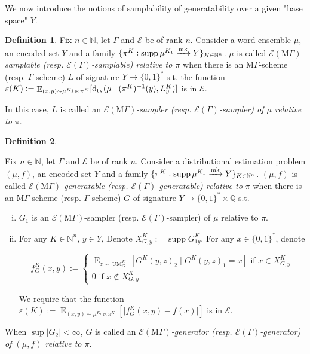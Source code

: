 \documentclass{article}
\numberwithin{equation}{section}
\theoremstyle{definition}
\newtheorem{definition}{Definition}[section]
\theoremstyle{plain}
\newcommand{\Bool}{\{0,1\}}
\newcommand{\Words}{{\Bool^*}}
\DeclareMathOperator{\Supp}{supp}
\DeclareMathOperator{\E}{E}
\DeclareMathOperator{\UM}{UM}
\newcommand{\Dtv}{\operatorname{d}_{\textnormal{tv}}}
\newcommand{\Nats}{\mathbb{N}}
\newcommand{\Rats}{\mathbb{Q}}
\newcommand{\Abs}[1]{\lvert #1 \rvert}
\newcommand{\MGrow}{\mathrm{M}\Gamma}
\newcommand{\Fall}{\mathcal{E}}
\newcommand{\Markov}{\xrightarrow{\textnormal{mk}}}
\begin{document}
We now introduce the notions of samplability of generatability over a given "base space" $Y$.

\begin{definition}

Fix $n \in \Nats$, let $\Gamma$ and $\Fall$ be of rank $n$. Consider a word ensemble $\mu$, an encoded set $Y$ and a family ${\{\pi^K: \Supp \mu^{K_1} \Markov Y\}_{K \in \Nats^n}}$. $\mu$ is called \emph{$\Fall(\MGrow)$-samplable (resp. $\Fall(\Gamma)$-samplable) relative to $\pi$} when there is an $\MGrow$-scheme (resp. $\Gamma$-scheme) $L$ of signature $Y \rightarrow \Words$ s.t. the function ${\varepsilon(K):=\E_{(x,y) \sim \mu^{K_1} \ltimes \pi^K}[\Dtv(\mu \mid (\pi^K)^{-1}(y),L_y^K)]}$ is in $\Fall$.

In this case, $L$ is called an \emph{$\Fall(\MGrow)$-sampler (resp. $\Fall(\Gamma)$-sampler) of $\mu$ relative to $\pi$}.

\end{definition}

\begin{samepage}
\begin{definition}
\label{def:gen_rel}

Fix $n \in \Nats$, let $\Gamma$ and $\Fall$ be of rank $n$. Consider a distributional estimation problem $(\mu,f)$, an encoded set $Y$ and a family $\{\pi^K: \Supp \mu^{K_1} \Markov Y\}_{K \in \Nats^n}$. $(\mu,f)$ is called \emph{$\Fall(\MGrow)$-generatable (resp. $\Fall(\Gamma)$-generatable) relative to $\pi$} when there is an $\MGrow$-scheme (resp. $\Gamma$-scheme) $G$ of signature $Y \rightarrow \Words \times \Rats$ s.t.

\begin{enumerate}[(i)]

\item $G_1$ is an $\Fall(\MGrow)$-sampler (resp. $\Fall(\Gamma)$-sampler) of $\mu$ relative to $\pi$.

\item For any $K \in \Nats^n$, $y \in Y$, Denote $X_{G,y}^K:=\Supp G_{1y}^K$. For any ${x \in \Words}$, denote 

$$f_G^K(x,y):=\begin{cases}\E_{z \sim\UM_G^K}[G^K(y,z)_2 \mid G^K(y,z)_1 = x] \text{ if } x \in X_{G,y}^K \\ 0 \text{ if } x \not\in X_{G,y}^K \end{cases}$$

We require that the function ${\varepsilon(K):=\E_{(x,y) \sim \mu^{K_1} \ltimes \pi^K}[\Abs{f_G^K(x,y)-f(x)}]}$ is in $\Fall$.

\end{enumerate}

When $\sup{\Abs{G_2}} < \infty$, $G$ is called an \emph{$\Fall(\MGrow)$-generator (resp. $\Fall(\Gamma)$-generator) of $(\mu,f)$ relative to $\pi$}.

\end{definition}
\end{samepage}
\end{document}
